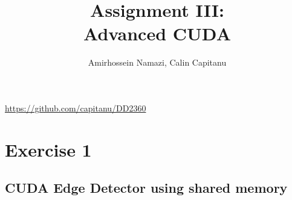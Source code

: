 \documentclass[english]{exam}
\begin{document}
\title{Assignment III:\\ Advanced CUDA}
\author{Amirhossein Namazi, Calin Capitanu}

\maketitle
\begin{center}
  \url{https://github.com/capitanu/DD2360} \\
\end{center}
\chapter{Exercise 1}
\section*{CUDA Edge Detector using shared memory}
\end{document}
